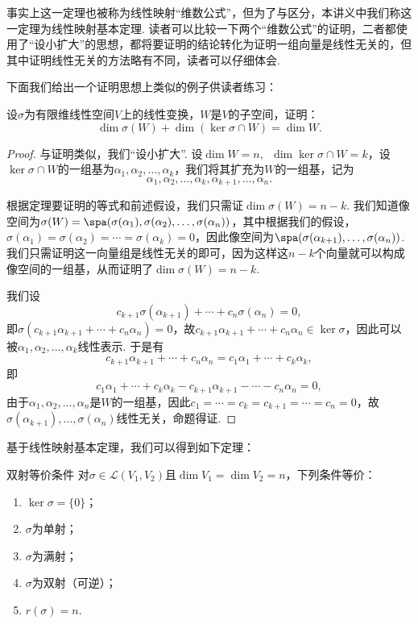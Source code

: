事实上这一定理也被称为线性映射``维数公式''，但为了与区分，本讲义中我们称这一定理为线性映射基本定理. 读者可以比较一下两个``维数公式''的证明，二者都使用了``设小扩大''的思想，都将要证明的结论转化为证明一组向量是线性无关的，但其中证明线性无关的方法略有不同，读者可以仔细体会.

下面我们给出一个证明思想上类似的例子供读者练习：
\begin{example}{}{}
    设$\sigma$为有限维线性空间$V$上的线性变换，$W$是$V$的子空间，证明：
    \[\dim\sigma(W)+\dim(\ker\sigma \cap W)=\dim W.\]
\end{example}

\begin{proof}
    与证明类似，我们``设小扩大''. 设$\dim W=n,\enspace\dim\ker\sigma\cap W=k$，设$\ker\sigma\cap W$的一组基为$\alpha_1,\alpha_2,\ldots,\alpha_k$，我们将其扩充为$W$的一组基，记为
    \[\alpha_1,\alpha_2,\ldots,\alpha_k,\alpha_{k+1},\ldots,\alpha_n.\]

    根据定理要证明的等式和前述假设，我们只需证$\dim\sigma(W)=n-k$. 我们知道像空间为$\sigma(W)=\spa(\sigma(\alpha_1),\sigma(\alpha_2),\ldots,\sigma(\alpha_n))$，其中根据我们的假设，$\sigma(\alpha_1)=\sigma(\alpha_2)=\cdots=\sigma(\alpha_k)=0$，因此像空间为$\spa(\sigma(\alpha_{k+1}),\ldots,\sigma(\alpha_n))$. 我们只需证明这一向量组是线性无关的即可，因为这样这$n-k$个向量就可以构成像空间的一组基，从而证明了$\dim\sigma(W)=n-k$.

    我们设
    \[c_{k+1}\sigma(\alpha_{k+1})+\cdots+c_n\sigma(\alpha_n)=0,\]
    即$\sigma(c_{k+1}\alpha_{k+1}+\cdots+c_n\alpha_n)=0$，故$c_{k+1}\alpha_{k+1}+\cdots+c_n\alpha_n\in\ker\sigma$，因此可以被$\alpha_1,\alpha_2,\ldots,\alpha_k$线性表示. 于是有
    \[c_{k+1}\alpha_{k+1}+\cdots+c_n\alpha_n=c_1\alpha_1+\cdots+c_k\alpha_k,\]
    即
    \[c_1\alpha_1+\cdots+c_k\alpha_k-c_{k+1}\alpha_{k+1}-\cdots-c_n\alpha_n=0,\]
    由于$\alpha_1,\alpha_2,\ldots,\alpha_n$是$W$的一组基，因此$c_1=\cdots=c_k=c_{k+1}=\cdots=c_n=0$，故$\sigma(\alpha_{k+1}),\ldots,\sigma(\alpha_n)$线性无关，命题得证.
\end{proof}

基于线性映射基本定理，我们可以得到如下定理：
\begin{theorem}{}{双射等价条件}
    对$\sigma \in \mathcal{L}(V_1,V_2)$且$\dim V_1=\dim V_2=n$，下列条件等价：
    \begin{enumerate}
        \item \label{item:6:双射等价条件:1}
              $\ker \sigma=\{0\}$；

        \item \label{item:6:双射等价条件:2}
              $\sigma$为单射；

        \item $\sigma$为满射；

        \item $\sigma$为双射（可逆）；

        \item $r(\sigma)=n$.
    \end{enumerate}
\end{theorem}

